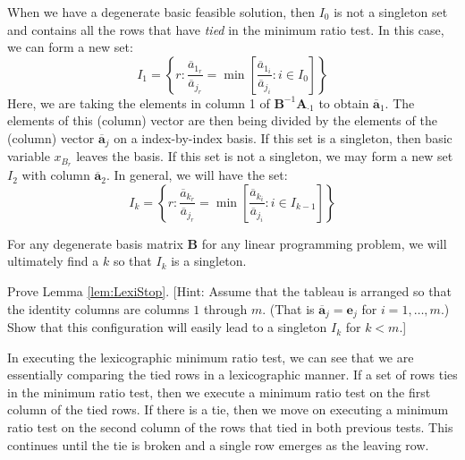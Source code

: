 When we have a degenerate basic feasible solution, then $I_0$ is not a singleton set and contains all the rows that have \textit{tied} in the minimum ratio test. In this case, we can form a new set:
\begin{equation}
I_1 = \left\{r : \frac{\overline{a}_{1_r}}{{\overline{a}_{j_r}}} = \min\left[ \frac{\overline{a}_{1_i}}{\overline{a}_{j_i}} : i\in I_0\right]\right\}
\end{equation}
Here, we are taking the elements in column 1 of $\mathbf{B}^{-1}\mathbf{A}_{\cdot 1}$ to obtain $\overline{\mathbf{a}}_1$. The elements of this (column) vector are then being divided by the elements of the (column) vector $\overline{\mathbf{a}}_{j}$ on a index-by-index basis. If this set is a singleton, then basic variable $x_{B_r}$ leaves the basis. If this set is not a singleton, we may form a new set $I_2$ with column  $\overline{\mathbf{a}}_2$. In general, we will have the set:
\begin{equation}
I_k = \left\{r : \frac{\overline{a}_{k_r}}{{\overline{a}_{j_r}}} = \min\left[ \frac{\overline{a}_{k_i}}{\overline{a}_{j_i}} : i\in I_{k-1}\right]\right\}
\end{equation}
\begin{lemma} For any degenerate basis matrix $\mathbf{B}$ for any linear programming problem, we will ultimately find a $k$ so that $I_k$ is a singleton.
\label{lem:LexiStop}
\end{lemma}
\begin{exercise} Prove Lemma \ref{lem:LexiStop}. [Hint: Assume that the tableau is arranged so that the identity columns are columns $1$ through $m$. (That is $\overline{\mathbf{a}}_j = \mathbf{e}_j$ for $i=1,\dots,m$.) Show that this configuration will easily lead to a singleton $I_k$ for $k < m$.]
\end{exercise}
In executing the lexicographic minimum ratio test, we can see that we are essentially comparing the tied rows in a lexicographic manner. If a set of rows ties in the minimum ratio test, then we execute a minimum ratio test on the first column of the tied rows. If there is a tie, then we move on executing a minimum ratio test on the second column of the rows that tied in both previous tests. This continues until the tie is broken and a single row emerges as the leaving row.
